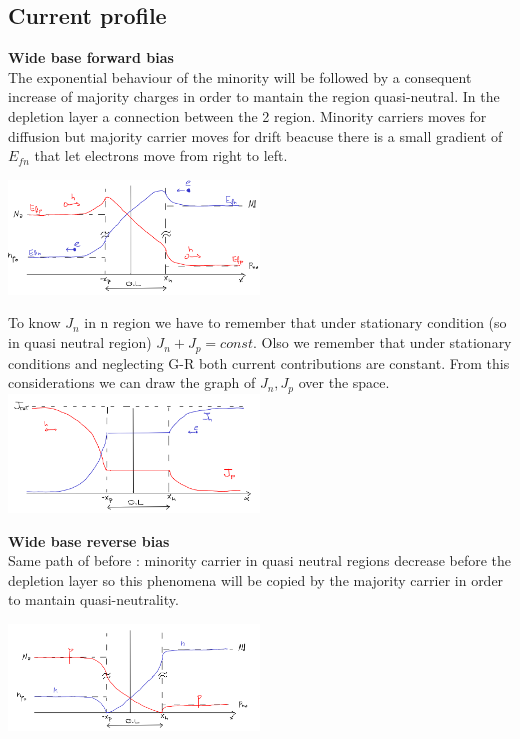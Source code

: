 \subsection{Current profile}
{\bf Wide base forward bias}\\
The exponential behaviour of the minority will be followed by a consequent increase of majority charges in order to mantain the region quasi-neutral. In the depletion layer a connection between the 2 region. Minority carriers moves for diffusion but majority carrier moves for drift beacuse there is a small gradient of $E_{fn}$ that let electrons move from right to left.

\centering
\includegraphics[width=0.5\textwidth]{nxfvb.png}\\
\raggedright

To know $J_n$ in n region we have to remember that under stationary condition (so in quasi neutral region) $J_n+J_p=const$. Olso we remember that under stationary conditions and neglecting G-R both current contributions are constant. From this considerations we can draw the graph of $J_n,J_p$ over the space.\\

\centering
\includegraphics[width=0.5\textwidth]{wbfbJ.png}\\
\raggedright

{\bf Wide base reverse bias}\\
Same path of before : minority carrier in quasi neutral regions decrease before the depletion layer so this phenomena will be copied by the majority carrier in order to mantain quasi-neutrality.

\centering
\includegraphics[width=0.5\textwidth]{rbwb.png}\\
\raggedright

